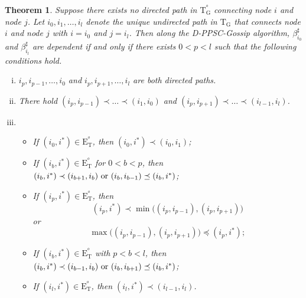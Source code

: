 \documentclass[a4paper, 11pt]{article}
\newcommand{\1}{\mathbf{1}}
\DeclareMathOperator{\sgn}{sgn}
\newcommand{\mG}{\mathrm{G}}
\newcommand{\mE}{\mathrm{E}}
\newcommand{\mT}{\mathrm{T}}
\newcommand{\mTG}{\mT^{^o}_{\mG}}
\newcommand{\mET}{\mE_{\mT}^{^o}}
\newtheorem{theorem}{Theorem}
\begin{document}
\medskip

\begin{theorem}\label{thm:dependence}
	Suppose there exists no directed path in $\mTG$ connecting node $i$ and node $j$. Let $i_0,i_1,\dots,i_l$ denote the unique undirected path in $\mathrm{T}_{\mG}$ that connects node $i$ and node $j$ with $i=i_0$ and $j=i_l$. Then along the D-PPSC-Gossip algorithm, $\beta^\sharp_{i_0}$ and $\beta^\sharp_{i_l}$ are dependent if and only if there exists $0<p<l$ such that the following conditions hold.
	\begin{enumerate}[(i)]
		\item $i_p,i_{p-1},\dots,i_{0}$ and $i_p,i_{p+1},\dots,i_l$ are both directed paths.
		\item There hold $(i_p,i_{p-1})\prec\dots\prec(i_1,i_0)$ and $(i_p,i_{p+1})\prec\dots\prec(i_{l-1},i_l)$.
		\item \begin{itemize}
			\item[a)]If $(i_0,i^\ast)\in\mET$, then $(i_0,i^\ast)\prec(i_0,i_{1})$;
			\item[b)]If $(i_b,i^\ast)\in\mET$ for $0<b<p$, then $(i_b,i^\ast)\prec(i_{b+1},i_{b})\textnormal{ or }(i_b,i_{b-1})\preceq(i_b,i^\ast)$;
			\item[c)] If $(i_p,i^\ast)\in\mET$, then $$(i_p,i^\ast)\prec\min\big((i_p,i_{p-1}),(i_p,i_{p+1})\big)$$ or $$\max\big((i_p,i_{p-1}),(i_p,i_{p+1})\big)\preceq(i_p,i^\ast);$$
			\item[d)] If $(i_b,i^\ast)\in\mET$ with $p<b<l$, then $(i_b,i^\ast)\prec(i_{b-1},i_{b})\textnormal{ or }(i_b,i_{b+1})\preceq(i_b,i^\ast)$;
			\item[e)] If $(i_l,i^\ast)\in\mET$, then
			$(i_l,i^\ast)\prec(i_{l-1},i_l)$.
		\end{itemize}
	\end{enumerate}
	
	
	

\end{theorem}
\end{document}
